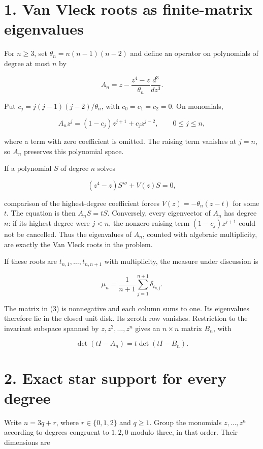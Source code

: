 \documentclass[11pt,a4paper]{article}
\begin{document}
\hypertarget{1032-van-vleck-roots-as-finite-matrix-eigenvalues}{%
\section{1. Van Vleck roots as finite-matrix
eigenvalues}\label{1032-van-vleck-roots-as-finite-matrix-eigenvalues}}

For \(n\geq3\), set \(\theta_n=n(n-1)(n-2)\) and define an operator on
polynomials of degree at most \(n\) by

\[
A_n=z-\frac{z^4-z}{\theta_n}\frac{d^3}{dz^3}.
\]

Put \(c_j=j(j-1)(j-2)/\theta_n\), with \(c_0=c_1=c_2=0\). On monomials,

\[
A_nz^j=(1-c_j)z^{j+1}+c_jz^{j-2},
\qquad 0\leq j\leq n,
\tag{3}
\]

where a term with zero coefficient is omitted. The raising term vanishes
at \(j=n\), so \(A_n\) preserves this polynomial space.

If a polynomial \(S\) of degree \(n\) solves

\[
(z^4-z)S'''+V(z)S=0,
\]

comparison of the highest-degree coefficient forces
\(V(z)=-\theta_n(z-t)\) for some \(t\). The equation is then
\(A_nS=tS\). Conversely, every eigenvector of \(A_n\) has degree \(n\):
if its highest degree were \(j<n\), the nonzero raising term
\((1-c_j)z^{j+1}\) could not be cancelled. Thus the eigenvalues of
\(A_n\), counted with algebraic multiplicity, are exactly the Van Vleck
roots in the problem.

If these roots are \(t_{n,1},\ldots,t_{n,n+1}\) with multiplicity, the
measure under discussion is

\[
\mu_n=\frac1{n+1}\sum_{j=1}^{n+1}\delta_{t_{n,j}}.
\]

The matrix in (3) is nonnegative and each column sums to one. Its
eigenvalues therefore lie in the closed unit disk. Its zeroth row
vanishes. Restriction to the invariant subspace spanned by
\(z,z^2,\ldots,z^n\) gives an \(n\times n\) matrix \(B_n\), with

\[
\det(tI-A_n)=t\det(tI-B_n).
\tag{4}
\]

\hypertarget{1032-exact-star-support-for-every-degree}{%
\section{2. Exact star support for every
degree}\label{1032-exact-star-support-for-every-degree}}

Write \(n=3q+r\), where \(r\in\{0,1,2\}\) and \(q\geq1\). Group the
monomials \(z,\ldots,z^n\) according to degrees congruent to \(1,2,0\)
modulo three, in that order. Their dimensions are
\end{document}
